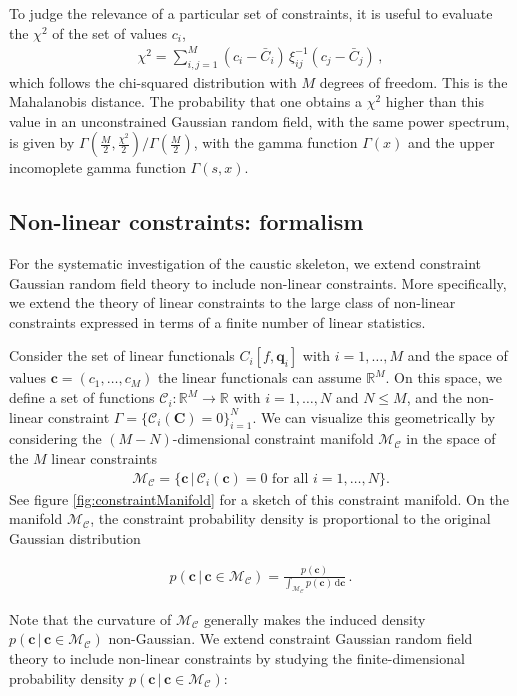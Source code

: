\documentclass[a4paper, 11pt]{article}
\begin{document}
To judge the relevance of a particular set of constraints, it is useful to evaluate the $\chi^2$ of the set of values $c_i$,
\begin{align}
\chi^2 = \sum_{i,j=1}^M (c_i-\bar{C}_i)\, \xi_{ij}^{-1}(c_j-\bar{C}_j)\,,
\end{align}
which follows the chi-squared distribution with $M$ degrees of freedom. This is the Mahalanobis distance. The probability that one obtains a $\chi^2$ higher than this value in an unconstrained Gaussian random field, with the same power spectrum, is given by $\Gamma\left(\frac{M}{2}, \frac{\chi^2}{2}\right)/\Gamma\left(\frac{M}{2}\right)$, with the gamma function $\Gamma(x)$ and the upper incomoplete gamma function $\Gamma(s,x)$.

\subsection{Non-linear constraints: formalism}
For the systematic investigation of the caustic skeleton, we extend constraint Gaussian random field theory to include non-linear constraints. More specifically, we extend the theory of linear constraints to the large class of non-linear constraints expressed in terms of a finite number of linear statistics.

Consider the set of linear functionals $C_i[f,\bm{q}_i]$ with $i=1,\dots,M$ and the space of values $\bm{c}=(c_1,\dots,c_M)$ the linear functionals can assume $\mathbb{R}^M$. On this space, we define a set of functions $\mathcal{C}_i:\mathbb{R}^M \to \mathbb{R}$ with $i=1,\dots,N$ and $N\leq M$, and the non-linear constraint $\Gamma = \{\mathcal{C}_i(\bm{C}) = 0\}_{i=1}^N$. We can visualize this geometrically by considering the $(M-N)$-dimensional constraint manifold $\mathcal{M}_\mathcal{C}$ in the space of the $M$ linear constraints
\begin{align}
\mathcal{M}_{\mathcal{C}} = 
\{\bm{c}\, |\, \mathcal{C}_i(\bm{c}) = 0 \text{ for all } i=1,\dots,N\}.
\end{align}
See figure \ref{fig:constraintManifold} for a sketch of this constraint manifold. On the manifold $\mathcal{M}_\mathcal{C}$, the constraint probability density is proportional to the original Gaussian distribution
\begin{framed}
\begin{align}
p(\bm{c}\,|\,\bm{c}\in \mathcal{M}_{\mathcal{C}})  = \frac{p(\bm{c})}{\int_{\mathcal{M}_\mathcal{C}} p(\bm{c})\, \mathrm{d}\bm{c}}\,.
\end{align}
\end{framed}
Note that the curvature of $\mathcal{M}_\mathcal{C}$ generally makes the induced density $p(\bm{c}\,|\,\bm{c}\in \mathcal{M}_{\mathcal{C}})$ non-Gaussian. We extend constraint Gaussian random field theory to include non-linear constraints by studying the finite-dimensional probability density $p(\bm{c}\,|\,\bm{c}\in \mathcal{M}_{\mathcal{C}})$:
\end{document}
